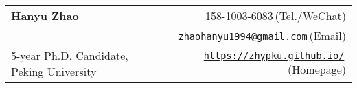 
\newcommand{\paint}[3]{
    \begin{minipage}{#1}
        \texttt{[image: \#3]}
    \end{minipage} 
}

\newcommand{\myheader}{
    \begin{tabular*}{\textwidth}{l@{\extracolsep{\fill}}r}
        \specialrule{0em}{4pt}{4pt}
        \textbf{{\LARGE Hanyu Zhao}} & 158-1003-6083$\,${\color{labelgrey}(Tel./WeChat)}\\
        & \href{mailto:zhaohanyu@pku.edu.cn}{\texttt{zhaohanyu1994@gmail.com}}$\,${\color{labelgrey}(Email)} \\
        {\large 5-year Ph.D. Candidate, Peking University} & \href{https://zhypku.github.io}{\texttt{https://zhypku.github.io/}}$\,${\color{labelgrey}(Homepage)} \\
    \end{tabular*}\\\vspace{0.1in}
}

\myheader

